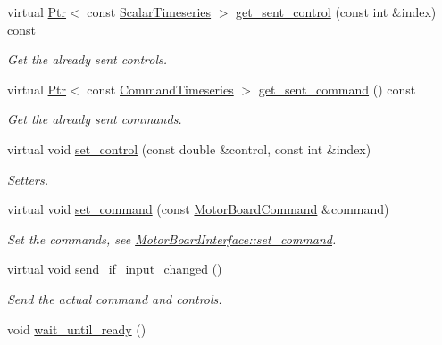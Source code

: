 \begin{DoxyCompactItemize}
virtual \hyperlink{classblmc__drivers_1_1MotorBoardInterface_a6a733b7ed7a3a96f6b0712b6bb5307f8}{Ptr}$<$ const \hyperlink{classblmc__drivers_1_1MotorBoardInterface_a14e237254ba495a66091ea3a3a33fa75}{Scalar\+Timeseries} $>$ \hyperlink{classblmc__drivers_1_1CanBusMotorBoard_a907629485fcf006e1e61b9739d3c94ec}{get\+\_\+sent\+\_\+control} (const int \&index) const 
\begin{DoxyCompactList}\small\item\em Get the already sent controls. \end{DoxyCompactList}\item 
virtual \hyperlink{classblmc__drivers_1_1MotorBoardInterface_a6a733b7ed7a3a96f6b0712b6bb5307f8}{Ptr}$<$ const \hyperlink{classblmc__drivers_1_1MotorBoardInterface_ae2afe94a023d9f08a4c689e9b7660f15}{Command\+Timeseries} $>$ \hyperlink{classblmc__drivers_1_1CanBusMotorBoard_a4e2920571e42aafa8045d1148f078a3a}{get\+\_\+sent\+\_\+command} () const 
\begin{DoxyCompactList}\small\item\em Get the already sent commands. \end{DoxyCompactList}\item 
virtual void \hyperlink{classblmc__drivers_1_1CanBusMotorBoard_a8dbd787fcfc25d68d5443e2f0bf21f64}{set\+\_\+control} (const double \&control, const int \&index)
\begin{DoxyCompactList}\small\item\em Setters. \end{DoxyCompactList}\item 
virtual void \hyperlink{classblmc__drivers_1_1CanBusMotorBoard_a4bb9c1f7f59507feed145111ccffc625}{set\+\_\+command} (const \hyperlink{classblmc__drivers_1_1MotorBoardCommand}{Motor\+Board\+Command} \&command)
\begin{DoxyCompactList}\small\item\em Set the commands, see \hyperlink{classblmc__drivers_1_1MotorBoardInterface_a86b4ff810ca652d6761090ceaff65621}{Motor\+Board\+Interface\+::set\+\_\+command}. \end{DoxyCompactList}\item 
virtual void \hyperlink{classblmc__drivers_1_1CanBusMotorBoard_a19ced11d06984528e6a2308c03ba83ac}{send\+\_\+if\+\_\+input\+\_\+changed} ()\hypertarget{classblmc__drivers_1_1CanBusMotorBoard_a19ced11d06984528e6a2308c03ba83ac}{}\label{classblmc__drivers_1_1CanBusMotorBoard_a19ced11d06984528e6a2308c03ba83ac}

\begin{DoxyCompactList}\small\item\em Send the actual command and controls. \end{DoxyCompactList}\item 
void \hyperlink{classblmc__drivers_1_1CanBusMotorBoard_a3c496f045d3ef68c02fe6dd5abbdc4eb}{wait\+\_\+until\+\_\+ready} ()\hypertarget{classblmc__drivers_1_1CanBusMotorBoard_a3c496f045d3ef68c02fe6dd5abbdc4eb}{}\label{classblmc__drivers_1_1CanBusMotorBoard_a3c496f045d3ef68c02fe6dd5abbdc4eb}


\end{DoxyCompactItemize}
